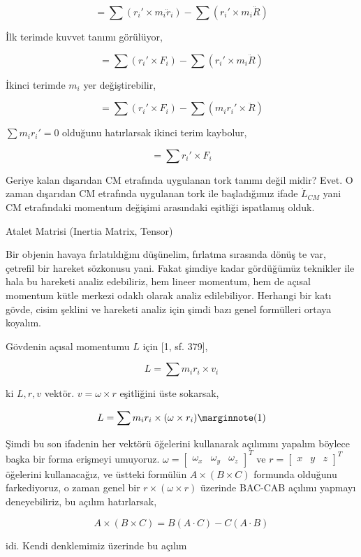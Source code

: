 \documentclass[12pt,fleqn]{article}\usepackage{../../common}
\begin{document}
$$
= \sum (r_i' \times m_i \ddot{r}_i) - \sum (r_i' \times m_i \ddot{R})
$$

İlk terimde kuvvet tanımı görülüyor,

$$
= \sum (r_i' \times F_i ) - \sum (r_i' \times m_i \ddot{R})
$$

İkinci terimde $m_i$ yer değiştirebilir,

$$
= \sum (r_i' \times F_i ) - \sum (m_i r_i' \times \ddot{R})
$$

$\sum m_i r_i'=0$ olduğunu hatırlarsak ikinci terim kaybolur,

$$
= \sum r_i' \times F_i 
$$

Geriye kalan dışarıdan CM etrafında uygulanan tork tanımı değil midir? Evet.  O
zaman dışarıdan CM etrafında uygulanan tork ile başladığımız ifade
$\dot{L}_{CM}$ yani CM etrafındaki momentum değişimi arasındaki eşitliği
ispatlamış olduk.

Atalet Matrisi (Inertia Matrix, Tensor)

Bir objenin havaya fırlatıldığını düşünelim, fırlatma sırasında dönüş te var,
çetrefil bir hareket sözkonusu yani. Fakat şimdiye kadar gördüğümüz teknikler
ile hala bu hareketi analiz edebiliriz, hem lineer momentum, hem de açısal
momentum kütle merkezi odaklı olarak analiz edilebiliyor. Herhangi bir katı
gövde, cisim şeklini ve hareketi analiz için şimdi bazı genel formülleri
ortaya koyalım. 

Gövdenin açısal momentumu $L$ için [1, sf. 379],

$$
L = \sum m_i r_i \times v_i
$$

ki $L,r,v$ vektör. $v = \omega \times r$ eşitliğini üste sokarsak,

$$
L = \sum m_i r_i \times (\omega \times r_i)
\mlabel{1}
$$

Şimdi bu son ifadenin her vektörü öğelerini kullanarak açılımını yapalım böylece
başka bir forma erişmeyi umuyoruz. $\omega = [\begin{array}{ccc} \omega_x&\omega_y&\omega_z \end{array}]^T$
ve $r = [\begin{array}{ccc} x&y&z \end{array}]^T$ öğelerini kullanacağız, ve
üstteki formülün $A \times (B \times C)$ formunda olduğunu farkediyoruz, o zaman
genel bir $r \times (\omega \times r)$ üzerinde BAC-CAB açılımı yapmayı
deneyebiliriz, bu açılım hatırlarsak,

$$
A \times (B \times C) = B(A \cdot C) - C(A \cdot B)
$$

idi. Kendi denklemimiz üzerinde bu açılım
\end{document}
